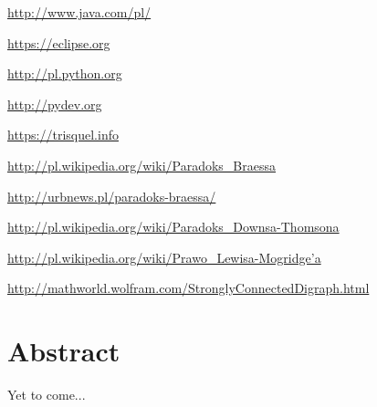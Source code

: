 \documentclass[twoside,12pt]{report}
\let\oldsection\chapter
\def\chapter{\cleardoublepage\oldsection}
\begin{document}
\begin{thebibliography}{99}
	\url{http://www.java.com/pl/}

	\url{https://eclipse.org}
				
	\url{http://pl.python.org}
	
	\url{http://pydev.org}
	
	\url{https://trisquel.info}
			
	\url{http://pl.wikipedia.org/wiki/Paradoks_Braessa}
	
	\url{http://urbnews.pl/paradoks-braessa/}
	
	\url{http://pl.wikipedia.org/wiki/Paradoks_Downsa-Thomsona}
	
	\href{http://pl.wikipedia.org/wiki/Prawo_Lewisa-Mogridge\%E2\%80\%99a}
	    {http://pl.wikipedia.org/wiki/Prawo\_Lewisa-Mogridge\textquoteright{}a}
	   
	\url{http://mathworld.wolfram.com/StronglyConnectedDigraph.html}

\end{thebibliography}

\cleardoublepage
{}
{}
\chapter*{Abstract}


Yet to come...
\end{document}
